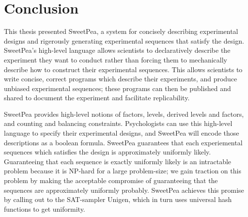 \chapter{Conclusion}

This thesis presented SweetPea, a system for concisely describing experimental designs and rigerously generating experimental sequences that satisfy the design. SweetPea's high-level language allows scientists to declaratively describe the experiment they want to conduct rather than forcing them to mechanically describe how to construct their experimental sequences. This allows scientists to write concise, correct programs which describe their experiments, and produce unbiased experimental sequences; these programs can then be published and shared to document the experiment and facilitate replicability.

SweetPea provides high-level notions of factors, levels, derived levels and factors, and counting and balancing constraints. Psychologists can use this high-level language to specify their experimental designs, and SweetPea will encode those descriptions as a boolean formula. SweetPea guarantees that each experiemental sequences which satisfies the design is approximately uniformly likely. Guaranteeing that each sequence is exactly uniformly likely is an intractable problem because it is NP-hard for a large problem-size; we gain traction on this problem by making the acceptable compromise of guaranteeing that the sequences are approximately uniformly probably. SweetPea achieves this promise by calling out to the SAT-sampler Unigen, which in turn uses universal hash functions to get uniformity.
